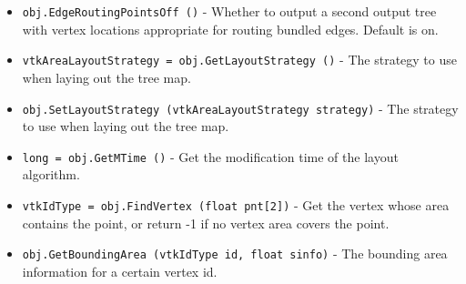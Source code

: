 \begin{itemize}
\item  \verb|obj.EdgeRoutingPointsOff ()| -  Whether to output a second output tree with vertex locations
 appropriate for routing bundled edges. Default is on.

\item  \verb|vtkAreaLayoutStrategy = obj.GetLayoutStrategy ()| -  The strategy to use when laying out the tree map.

\item  \verb|obj.SetLayoutStrategy (vtkAreaLayoutStrategy strategy)| -  The strategy to use when laying out the tree map.

\item  \verb|long = obj.GetMTime ()| -  Get the modification time of the layout algorithm.

\item  \verb|vtkIdType = obj.FindVertex (float pnt[2])| -  Get the vertex whose area contains the point, or return -1
 if no vertex area covers the point.

\item  \verb|obj.GetBoundingArea (vtkIdType id, float sinfo)| -  The bounding area information for a certain vertex id.

\end{itemize}
